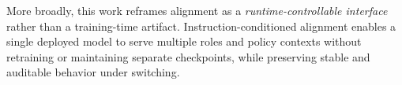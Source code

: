 More broadly, this work reframes alignment as a \emph{runtime-controllable interface} rather than a training-time artifact. Instruction-conditioned alignment enables a single deployed model to serve multiple roles and policy contexts without retraining or maintaining separate checkpoints, while preserving stable and auditable behavior under switching.







